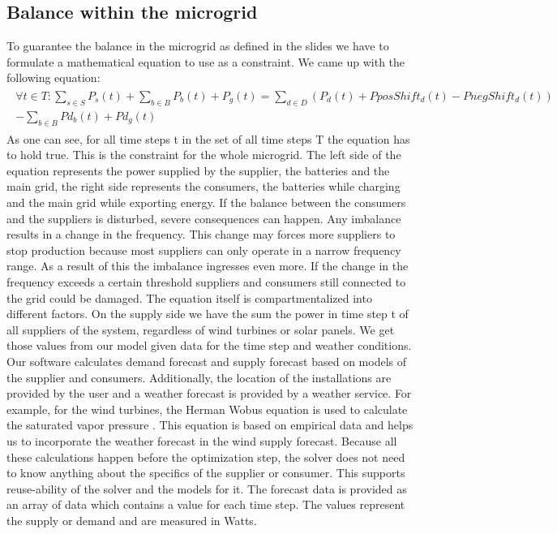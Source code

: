 \subsection{Balance within the microgrid}
To guarantee the balance in the microgrid as defined in the slides we have to formulate a mathematical equation to use as a constraint.
We came up with the following equation:\\
\begin{align} \label{eq1:balance}
\begin{split}
\forall t \in T: \sum_{s \in S}{P_{s}(t)} + \sum_{b \in B}{P_{b}(t)} + P_{g}(t) = \sum_{d \in D}({P_{d}(t)} + PposShift_d(t) - PnegShift_d(t))
\\ - \sum_{b \in B}{Pd_{b}(t)} + Pd_g(t)
\end{split}
\end{align}
As one can see, for all time steps t in the set of all time steps T the equation has to hold true. 
This is the constraint for the whole microgrid. The left side of the equation represents the power supplied by the supplier, the batteries and the main grid, the right side represents the consumers, the batteries while charging and the main grid while exporting energy. If the balance between the consumers and the suppliers is disturbed, severe consequences can happen. Any imbalance results in a change in the frequency. This change may forces more suppliers to stop production because most suppliers can only operate in a narrow frequency range. As a result of this the imbalance ingresses even more. If the change in the frequency exceeds a certain threshold suppliers and consumers still connected to the grid could be damaged. 
The equation itself is compartmentalized into different factors.
On the supply side we have the sum the power in time step t of all suppliers of the system, regardless of wind turbines or solar panels.
We get those values from our model given data for the time step and weather conditions. Our software calculates demand forecast and supply forecast based on models of the supplier and consumers. Additionally, the location of the installations are provided by the user and a weather forecast is provided by a weather service. For example, for the wind turbines, the Herman Wobus equation is used to calculate the saturated vapor pressure \cite{NOAA}. This equation is based on empirical data and helps us to incorporate the weather forecast in the wind supply forecast. Because all these calculations happen before the optimization step, the solver does not need to know anything about the specifics of the supplier or consumer. This supports reuse-ability of the solver and the models for it. The forecast data is provided as an array of data which contains a value for each time step. The values represent the supply or demand and are measured in Watts. 
